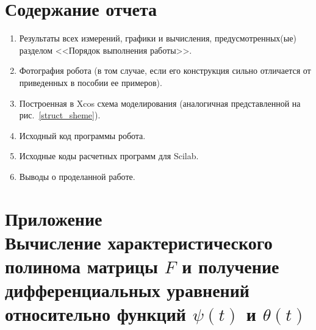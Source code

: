 \documentclass[12pt,a4paper,openany]{extarticle}
\begin{document}
\section{Содержание отчета}
\begin{enumerate}
\item Результаты всех измерений, графики и вычисления, предусмотренных(ые) разделом <<Порядок выполнения работы>>.
\item Фотография робота (в том случае, если его конструкция сильно отличается от приведенных в пособии ее примеров).
\item Построенная в Xcos схема моделирования (аналогичная представленной на рис.~\ref{struct_sheme}).
\item Исходный код программы робота.
\item Исходные коды расчетных программ для Scilab.
\item Выводы о проделанной работе.
\end{enumerate}

\newpage
\section*{Приложение~\myappnum\label{append:some_maths}\\
Вычисление характеристического полинома матрицы $F$ и получение дифференциальных уравнений относительно функций $\psi(t)$ и $\theta(t)$}
\end{document}
